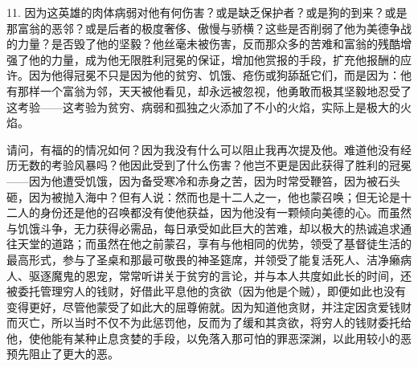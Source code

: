 11. 因为这英雄的肉体病弱对他有何伤害？或是缺乏保护者？或是狗的到来？或是那富翁的恶邻？或是后者的极度奢侈、傲慢与骄横？这些是否削弱了他为美德争战的力量？是否毁了他的坚毅？他丝毫未被伤害，反而那众多的苦难和富翁的残酷增强了他的力量，成为他无限胜利冠冕的保证，增加他赏报的手段，扩充他报酬的应许。因为他得冠冕不只是因为他的贫穷、饥饿、疮伤或狗舔舐它们，而是因为：他有那样一个富翁为邻，天天被他看见，却永远被忽视，他勇敢而极其坚毅地忍受了这考验——这考验为贫穷、病弱和孤独之火添加了不小的火焰，实际上是极大的火焰。\newline{}\par

请问，有福的的情况如何？因为我没有什么可以阻止我再次提及他。难道他没有经历无数的考验风暴吗？他因此受到了什么伤害？他岂不更是因此获得了胜利的冠冕——因为他遭受饥饿，因为备受寒冷和赤身之苦，因为时常受鞭笞，因为被石头砸，因为被抛入海中？但有人说：然而也是十二人之一，他也蒙召唤；但无论是十二人的身份还是他的召唤都没有使他获益，因为他没有一颗倾向美德的心。而虽然与饥饿斗争，无力获得必需品，每日承受如此巨大的苦难，却以极大的热诚追求通往天堂的道路；而虽然在他之前蒙召，享有与他相同的优势，领受了基督徒生活的最高形式，参与了圣桌和那最可敬畏的神圣筵席，并领受了能复活死人、洁净癞病人、驱逐魔鬼的恩宠，常常听讲关于贫穷的言论，并与本人共度如此长的时间，还被委托管理穷人的钱财，好借此平息他的贪欲（因为他是个贼），即便如此也没有变得更好，尽管他蒙受了如此大的屈尊俯就。因为知道他贪财，并注定因贪爱钱财而灭亡，所以当时不仅不为此惩罚他，反而为了缓和其贪欲，将穷人的钱财委托给他，使他能有某种止息贪婪的手段，以免落入那可怕的罪恶深渊，以此用较小的恶预先阻止了更大的恶。\par

